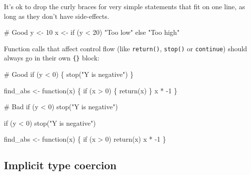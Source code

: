 \documentclass[twoside, pagesize, fontsize=11pt, dvipsnames]{scrreport} %
\newenvironment{Shaded}{\begin{snugshade}}{\end{snugshade}}
\newcommand{\CommentTok}[1]{\textcolor[rgb]{0.37,0.37,0.37}{#1}}
\newcommand{\ControlFlowTok}[1]{\textcolor[rgb]{0.00,0.23,0.31}{#1}}
\newcommand{\DecValTok}[1]{\textcolor[rgb]{0.68,0.00,0.00}{#1}}
\newcommand{\FunctionTok}[1]{\textcolor[rgb]{0.28,0.35,0.67}{#1}}
\newcommand{\NormalTok}[1]{\textcolor[rgb]{0.00,0.23,0.31}{#1}}
\newcommand{\OtherTok}[1]{\textcolor[rgb]{0.00,0.23,0.31}{#1}}
\newcommand{\SpecialCharTok}[1]{\textcolor[rgb]{0.37,0.37,0.37}{#1}}
\newcommand{\StringTok}[1]{\textcolor[rgb]{0.13,0.47,0.30}{#1}}
\begin{document}
It's ok to drop the curly braces for very simple statements that fit on
one line, as long as they don't have side-effects.

\begin{Shaded}
\begin{Highlighting}[]
\CommentTok{\# Good}
\NormalTok{y }\OtherTok{\textless{}{-}} \DecValTok{10}
\NormalTok{x }\OtherTok{\textless{}{-}} \ControlFlowTok{if}\NormalTok{ (y }\SpecialCharTok{\textless{}} \DecValTok{20}\NormalTok{) }\StringTok{"Too low"} \ControlFlowTok{else} \StringTok{"Too high"}
\end{Highlighting}
\end{Shaded}

Function calls that affect control flow (like \texttt{return()},
\texttt{stop()} or \texttt{continue}) should always go in their own
\texttt{\{\}} block:

\begin{Shaded}
\begin{Highlighting}[]
\CommentTok{\# Good}
\ControlFlowTok{if}\NormalTok{ (y }\SpecialCharTok{\textless{}} \DecValTok{0}\NormalTok{) \{}
  \FunctionTok{stop}\NormalTok{(}\StringTok{"Y is negative"}\NormalTok{)}
\NormalTok{\}}

\NormalTok{find\_abs }\OtherTok{\textless{}{-}} \ControlFlowTok{function}\NormalTok{(x) \{}
  \ControlFlowTok{if}\NormalTok{ (x }\SpecialCharTok{\textgreater{}} \DecValTok{0}\NormalTok{) \{}
    \FunctionTok{return}\NormalTok{(x)}
\NormalTok{  \}}
\NormalTok{  x }\SpecialCharTok{*} \SpecialCharTok{{-}}\DecValTok{1}
\NormalTok{\}}

\CommentTok{\# Bad}
\ControlFlowTok{if}\NormalTok{ (y }\SpecialCharTok{\textless{}} \DecValTok{0}\NormalTok{) }\FunctionTok{stop}\NormalTok{(}\StringTok{"Y is negative"}\NormalTok{)}

\ControlFlowTok{if}\NormalTok{ (y }\SpecialCharTok{\textless{}} \DecValTok{0}\NormalTok{)}
  \FunctionTok{stop}\NormalTok{(}\StringTok{"Y is negative"}\NormalTok{)}

\NormalTok{find\_abs }\OtherTok{\textless{}{-}} \ControlFlowTok{function}\NormalTok{(x) \{}
  \ControlFlowTok{if}\NormalTok{ (x }\SpecialCharTok{\textgreater{}} \DecValTok{0}\NormalTok{) }\FunctionTok{return}\NormalTok{(x)}
\NormalTok{  x }\SpecialCharTok{*} \SpecialCharTok{{-}}\DecValTok{1}
\NormalTok{\}}
\end{Highlighting}
\end{Shaded}

\hypertarget{implicit-type-coercion}{%
\subsection{Implicit type coercion}\label{implicit-type-coercion}}
\end{document}
